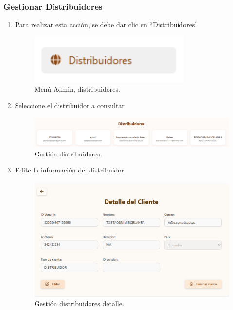 \subsubsection{Gestionar Distribuidores}

 \begin{enumerate}
 \item Para realizar esta acción, se debe dar clic en “Distribuidores”
 \begin{figure}[H]
     \centering
     \includegraphics[width=0.3\linewidth]{guiamodulo/menu-admin-distribuidores.png}
     \caption{Menú Admin, distribuidores.}
     \label{fig:menu-admin-distribuidores}
 \end{figure}

 \item Seleccione el distribuidor a consultar
 \begin{figure}[H]
     \centering
     \includegraphics[width=0.7\linewidth]{guiamodulo/gestion-distribuidores.png}
     \caption{Gestión distribuidores.}
     \label{fig:gestion-distribuidores.png}
 \end{figure}

 \item Edite la información del distribuidor
 \begin{figure}[H]
     \centering
     \includegraphics[width=0.7\linewidth]{guiamodulo/gestion-distribuidores-detalle.png}
     \caption{Gestión distribuidores detalle.}
     \label{fig:gestion-distribuidores-detalle.png}
 \end{figure}

 \end{enumerate}


